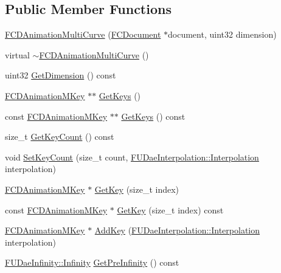 \subsection*{Public Member Functions}
\begin{DoxyCompactItemize}
\item 
\hyperlink{classFCDAnimationMultiCurve_a2d24f269824f986407c0fa247b80e96c}{FCDAnimationMultiCurve} (\hyperlink{classFCDocument}{FCDocument} $\ast$document, uint32 dimension)
\item 
virtual \hyperlink{classFCDAnimationMultiCurve_a1de4b1de48116068c3897b82860a8060}{$\sim$FCDAnimationMultiCurve} ()
\item 
uint32 \hyperlink{classFCDAnimationMultiCurve_a0b6badef0fb401db1e99820d043a69f4}{GetDimension} () const 
\item 
\hyperlink{classFCDAnimationMKey}{FCDAnimationMKey} $\ast$$\ast$ \hyperlink{classFCDAnimationMultiCurve_acd3398ca66622d9f62edccd64fb97049}{GetKeys} ()
\item 
const \hyperlink{classFCDAnimationMKey}{FCDAnimationMKey} $\ast$$\ast$ \hyperlink{classFCDAnimationMultiCurve_a08a4162ad5ca67540472f1c1113ddce6}{GetKeys} () const 
\item 
size\_\-t \hyperlink{classFCDAnimationMultiCurve_a2c54b98723c4909c93c9a6ec151ef234}{GetKeyCount} () const 
\item 
void \hyperlink{classFCDAnimationMultiCurve_adf25740adf8ddfabcf64bd1cbc83e5f7}{SetKeyCount} (size\_\-t count, \hyperlink{namespaceFUDaeInterpolation_a209a941c2fb6ece1325352968aa0374f}{FUDaeInterpolation::Interpolation} interpolation)
\item 
\hyperlink{classFCDAnimationMKey}{FCDAnimationMKey} $\ast$ \hyperlink{classFCDAnimationMultiCurve_a5f8632aed8843243c3f8a8c94146a93e}{GetKey} (size\_\-t index)
\item 
const \hyperlink{classFCDAnimationMKey}{FCDAnimationMKey} $\ast$ \hyperlink{classFCDAnimationMultiCurve_aee9dedbdf473e27cb9d448cc9da4826b}{GetKey} (size\_\-t index) const 
\item 
\hyperlink{classFCDAnimationMKey}{FCDAnimationMKey} $\ast$ \hyperlink{classFCDAnimationMultiCurve_af8b1447f1ab5fd021b6e8e61d45bc08c}{AddKey} (\hyperlink{namespaceFUDaeInterpolation_a209a941c2fb6ece1325352968aa0374f}{FUDaeInterpolation::Interpolation} interpolation)
\item 
\hyperlink{namespaceFUDaeInfinity_a9d8fb86affe94d1586d728d4c2e89008}{FUDaeInfinity::Infinity} \hyperlink{classFCDAnimationMultiCurve_a3ce35c4236b8e07a5c48dc6c6203898c}{GetPreInfinity} () const 

\end{DoxyCompactItemize}
